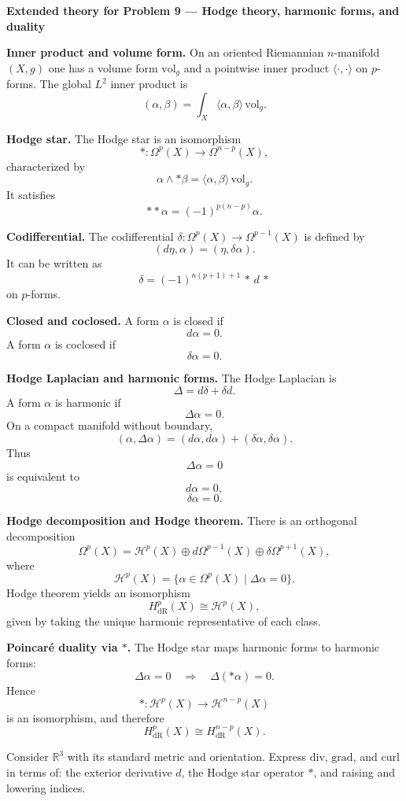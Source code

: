 \begin{solution}
\par\medskip\noindent\textbf{Extended theory for Problem 9 --- Hodge theory, harmonic forms, and duality}\par\smallskip


\textbf{Inner product and volume form.}
On an oriented Riemannian $n$-manifold $(X,g)$ one has a volume form $\mathrm{vol}_g$ and a pointwise inner product $\langle\cdot,\cdot\rangle$ on $p$-forms.
The global $L^2$ inner product is
\[
(\alpha,\beta)=\int_X \langle \alpha,\beta\rangle\,\mathrm{vol}_g.
\]

\textbf{Hodge star.}
The Hodge star is an isomorphism
\[
*:\Omega^p(X)\to\Omega^{n-p}(X),
\]
characterized by
\[
\alpha\wedge *\beta=\langle \alpha,\beta\rangle\,\mathrm{vol}_g.
\]
It satisfies
\[
**\alpha = (-1)^{p(n-p)}\alpha.
\]

\textbf{Codifferential.}
The codifferential $\delta:\Omega^p(X)\to\Omega^{p-1}(X)$ is defined by
\[
(d\eta,\alpha)=(\eta,\delta\alpha).
\]
It can be written as
\[
\delta = (-1)^{n(p+1)+1}\,*\,d\,*
\]
on $p$-forms.

\textbf{Closed and coclosed.}
A form $\alpha$ is closed if
\[
d\alpha=0.
\]
A form $\alpha$ is coclosed if
\[
\delta\alpha=0.
\]

\textbf{Hodge Laplacian and harmonic forms.}
The Hodge Laplacian is
\[
\Delta=d\delta+\delta d.
\]
A form $\alpha$ is harmonic if
\[
\Delta\alpha=0.
\]
On a compact manifold without boundary,
\[
(\alpha,\Delta\alpha)=(d\alpha,d\alpha)+(\delta\alpha,\delta\alpha).
\]
Thus
\[
\Delta\alpha=0
\]
is equivalent to
\[
d\alpha=0,
\]
\[
\delta\alpha=0.
\]

\textbf{Hodge decomposition and Hodge theorem.}
There is an orthogonal decomposition
\[
\Omega^p(X)=\mathcal{H}^p(X)\oplus d\Omega^{p-1}(X)\oplus \delta\Omega^{p+1}(X),
\]
where
\[
\mathcal{H}^p(X)=\{\alpha\in\Omega^p(X)\mid \Delta\alpha=0\}.
\]
Hodge theorem yields an isomorphism
\[
H^p_{\mathrm{dR}}(X)\cong \mathcal{H}^p(X),
\]
given by taking the unique harmonic representative of each class.

\textbf{Poincar\'e duality via $*$.}
The Hodge star maps harmonic forms to harmonic forms:
\[
\Delta\alpha=0
\quad\Longrightarrow\quad
\Delta(*\alpha)=0.
\]
Hence
\[
*:\mathcal{H}^p(X)\to\mathcal{H}^{n-p}(X)
\]
is an isomorphism, and therefore
\[
H^p_{\mathrm{dR}}(X)\cong H^{n-p}_{\mathrm{dR}}(X).
\]
\end{solution}

\begin{problem}
\label{prob:cp-vii-0034}
Consider $\mathbb{R}^3$ with its standard metric and orientation.
Express $\mathrm{div}$, $\mathrm{grad}$, and $\mathrm{curl}$ in terms of: the exterior derivative $d$, the Hodge star operator $*$, and raising and lowering indices.
\end{problem}

